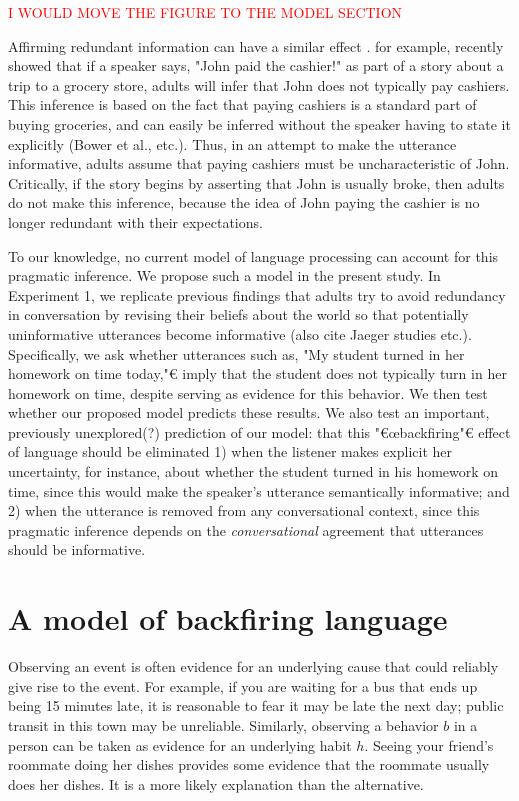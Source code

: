 \documentclass[10pt,letterpaper]{article}
\newcommand{\red}[1]{\textcolor{Red}{#1}}
\begin{document}
\red{I WOULD MOVE THE FIGURE TO THE MODEL SECTION}

Affirming redundant information can have a similar effect \cite{Gruenfeld1992, Kravtchenko2015}.  
 for example, recently showed that if a speaker says, "John paid the cashier!" as part of a story about a trip to a grocery store, adults will infer that John does not typically pay cashiers.  This inference is based on the fact that paying cashiers is a standard part of buying groceries, and can easily be inferred without the speaker having to state it explicitly (Bower et al., etc.).  Thus, in an attempt to make the utterance informative, adults assume that paying cashiers must be uncharacteristic of John.  Critically, if the story begins by asserting that John is usually broke, then adults do not make this inference, because the idea of John paying the cashier is no longer redundant with their expectations.

To our knowledge, no current model of language processing can account for this pragmatic inference.  We propose such a model in the present study.  In Experiment 1, we replicate previous findings that adults try to avoid redundancy in conversation by revising their beliefs about the world so that potentially uninformative utterances become informative \cite{Kravtchenko2015} (also cite Jaeger studies etc.).  Specifically, we ask whether utterances such as, "My student turned in her homework on time today,"€ imply that the student does not typically turn in her homework on time, despite serving as evidence for this behavior.  We then test whether our proposed model predicts these results.  We also test an important, previously unexplored(?) prediction of our model: that this "€œbackfiring"€ effect of language should be eliminated 1) when the listener makes explicit her uncertainty, for instance, about whether the student turned in his homework on time, since this would make the speaker's utterance semantically informative; and 2) when the utterance is removed from any conversational context, since this pragmatic inference depends on the \emph{conversational} agreement that utterances should be informative.

\section{A model of backfiring language}

Observing an event is often evidence for an underlying cause that could reliably give rise to the event.
For example, if you are waiting for a bus that ends up being 15 minutes late, it is reasonable to fear it may be late the next day; public transit in this town may be unreliable. 
Similarly, observing a behavior $b$ in a person can be taken as evidence for an underlying habit $h$. 
Seeing your friend's roommate doing her dishes provides some evidence that the roommate usually does her dishes. 
It is a more likely explanation than the alternative.
\end{document}
